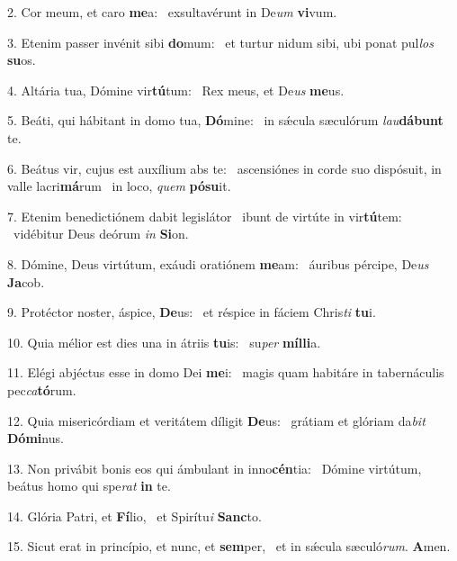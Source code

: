 2. Cor meum, et caro \textbf{me}a: \ast\  exsultavérunt in De\textit{um} \textbf{vi}vum.\

3. Etenim passer invénit sibi \textbf{do}mum: \ast\  et turtur nidum sibi, ubi ponat pul\textit{los} \textbf{su}os.\

4. Altária tua, Dómine vir\textbf{tú}tum: \ast\  Rex meus, et De\textit{us} \textbf{me}us.\

5. Beáti, qui hábitant in domo tua, \textbf{Dó}mine: \ast\  in sǽcula sæculórum \textit{lau}\textbf{dá}\textbf{bunt} te.\

6. Beátus vir, cujus est auxílium abs te: \dag\  ascensiónes in corde suo dispósuit, in valle lacri\textbf{má}rum \ast\  in loco, \textit{quem} \textbf{pó}\textbf{su}it.\

7. Etenim benedictiónem dabit legislátor \dag\  ibunt de virtúte in vir\textbf{tú}tem: \ast\  vidébitur Deus deórum \textit{in} \textbf{Si}on.\

8. Dómine, Deus virtútum, exáudi oratiónem \textbf{me}am: \ast\  áuribus pércipe, De\textit{us} \textbf{Ja}cob.\

9. Protéctor noster, áspice, \textbf{De}us: \ast\  et réspice in fáciem Chris\textit{ti} \textbf{tu}i.\

10. Quia mélior est dies una in átriis \textbf{tu}is: \ast\  su\textit{per} \textbf{míl}\textbf{li}a.\

11. Elégi abjéctus esse in domo Dei \textbf{me}i: \ast\  magis quam habitáre in tabernáculis pec\textit{ca}\textbf{tó}rum.\

12. Quia misericórdiam et veritátem díligit \textbf{De}us: \ast\  grátiam et glóriam da\textit{bit} \textbf{Dó}\textbf{mi}nus.\

13. Non privábit bonis eos qui ámbulant in inno\textbf{cén}tia: \ast\  Dómine virtútum, beátus homo qui spe\textit{rat} \textbf{in} te.\

14. Glória Patri, et \textbf{Fí}lio, \ast\  et Spirítu\textit{i} \textbf{Sanc}to.\

15. Sicut erat in princípio, et nunc, et \textbf{sem}per, \ast\  et in sǽcula sæculó\textit{rum}. \textbf{A}men.\

